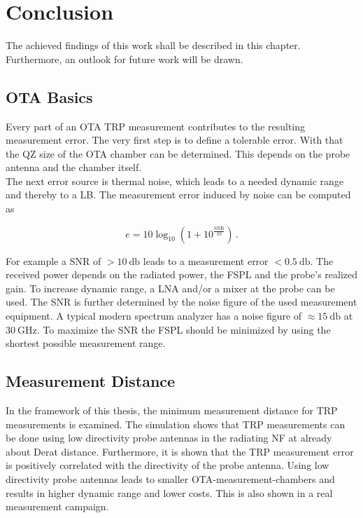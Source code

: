 \chapter{Conclusion}

The achieved findings of this work shall be described in this chapter. Furthermore, an outlook for future work will be drawn.

\section{OTA Basics}

Every part of an \acf{OTA} \acf{TRP} measurement contributes to the resulting measurement error. The very first step is to define a tolerable error. With that the \acf{QZ} size of the \ac{OTA} chamber can be determined. This depends on the probe antenna and the chamber itself.\\
The next error source is thermal noise, which leads to a needed dynamic range and thereby to a \acf{LB}. The measurement error induced by noise can be computed as 

\begin{equation}
e = 10\log_{10}\left(1+10^{\frac{\text{SNR}}{10}}\right)\,.
\end{equation}

For example a \acf{SNR} of $>\SI{10}{\decibel}$ leads to a measurement error $<\SI{0.5}{\decibel}$. The received power depends on the radiated power, the \acf{FSPL} and the probe's realized gain. To increase dynamic range, a \acf{LNA} and/or a mixer at the probe can be used. The \ac{SNR} is further determined by the noise figure of the used measurement equipment. A typical modern spectrum analyzer has a noise figure of $\approx\SI{15}{\decibel}$ at $\SI{30}{\giga\hertz}$. To maximize the \ac{SNR} the \ac{FSPL} should be minimized by using the shortest possible measurement range.

\section{Measurement Distance}

In the framework of this thesis, the minimum measurement distance for \acf{TRP} measurements is examined. The simulation shows that \ac{TRP} measurements can be done using low directivity probe antennas in the radiating \acf{NF} at already about Derat distance. Furthermore, it is shown that the \ac{TRP} measurement error is positively correlated with the directivity of the probe antenna. Using low directivity probe antennas leads to smaller \ac{OTA}-measurement-chambers and results in higher dynamic range and lower costs. This is also shown in a real measurement campaign.

